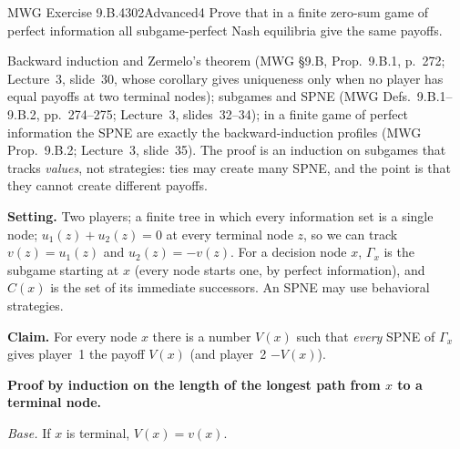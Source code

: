 \begin{exsol}{MWG Exercise 9.B.4}{302}{Advanced}{4}
\asked Prove that in a finite zero-sum game of perfect information all subgame-perfect Nash
equilibria give the same payoffs.

\method Backward induction and Zermelo's theorem (MWG \S9.B, Prop.~9.B.1, p.~272; Lecture~3,
slide~30, whose corollary gives uniqueness only when no player has equal payoffs at two terminal
nodes); subgames and SPNE (MWG Defs.~9.B.1--9.B.2, pp.~274--275; Lecture~3, slides~32--34); in a
finite game of perfect information the SPNE are exactly the backward-induction profiles (MWG
Prop.~9.B.2; Lecture~3, slide~35). The proof is an induction on subgames that tracks
\emph{values}, not strategies: ties may create many SPNE, and the point is that they cannot create
different payoffs.

\solution
\textbf{Setting.} Two players; a finite tree in which every information set is a single node;
$u_1(z) + u_2(z) = 0$ at every terminal node $z$, so we can track $v(z) = u_1(z)$ and $u_2(z) =
-v(z)$. For a decision node $x$, $\Gamma_x$ is the subgame starting at $x$ (every node starts one,
by perfect information), and $C(x)$ is the set of its immediate successors. An SPNE may use
behavioral strategies.

\textbf{Claim.} For every node $x$ there is a number $V(x)$ such that \emph{every} SPNE of
$\Gamma_x$ gives player~1 the payoff $V(x)$ (and player~2 $-V(x)$).

\textbf{Proof by induction on the length of the longest path from $x$ to a terminal node.}

\emph{Base.} If $x$ is terminal, $V(x) = v(x)$.


\end{exsol}
